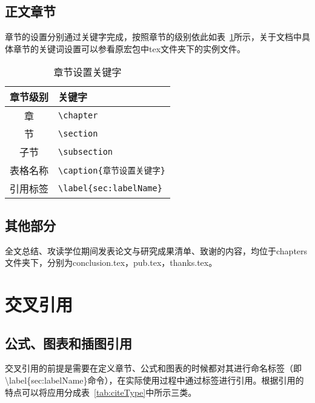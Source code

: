 \subsection{正文章节}
章节的设置分别通过关键字完成，按照章节的级别依此如表~\ref{tab:setSection}所示，关于文档中具体章节的关键词设置可以参看原宏包中tex文件夹下的实例文件。

\begin{table}[htb]
 \centering
  \caption{章节设置关键字}     %
  \label{tab:setSection}    %
  \begin{tabular}{cl}
    \hline
    章节级别        & 关键字     \\
    \hline
     章        & \verb|\chapter| \\
     节        & \verb|\section | \\
    子节      & \verb|\subsection |\\
    表格名称       & \verb|\caption{章节设置关键字}| \\
    引用标签       & \verb|\label{sec:labelName}| \\
    \hline
  \end{tabular}
\end{table}

\subsection{其他部分}


全文总结、攻读学位期间发表论文与研究成果清单、致谢的内容，均位于chapters文件夹下，分别为conclusion.tex，pub.tex，thanks.tex。

\section{交叉引用}
\subsection{公式、图表和插图引用}
\label{sec:refofFigAndTab}
交叉引用的前提是需要在定义章节、公式和图表的时候都对其进行命名标签（即\textbackslash label\{sec:labelName\}命令），在实际使用过程中通过标签进行引用。根据引用的特点可以将应用分成表~\ref{tab:citeType}中所示三类。

